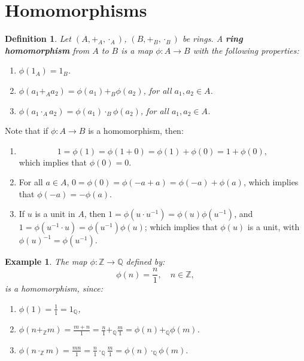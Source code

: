 \documentclass[a4paper,12pt]{report}
\newcounter{statement}
\numberwithin{statement}{chapter}
\newtheorem{defn}[statement]{Definition}
\newtheorem{eg}[statement]{\bf Example}
\numberwithin{equation}{chapter}
\numberwithin{section}{chapter}
\numberwithin{subsection}{section}
\begin{document}
\section{Homomorphisms}

\begin{defn}
Let $(A, +_A, \cdot_A)$, $(B, +_B, \cdot_B)$ be rings.  A  {\bf ring homomorphism}  from $A$ to $B$
is a map $\phi: A \rightarrow B$ with the following properties:
\begin{enumerate}
\item 
$\phi(1_A) = 1_B$.

\item 
$\phi(a_1 +_A a_2) = \phi(a_1) +_B \phi(a_2)$, for all $a_1, a_2 \in A$.

\item 
$\phi(a_1\cdot_A a_2) = \phi(a_1)\cdot_B \phi(a_2)$, for all $a_1, a_2 \in A$.
\end{enumerate}
\end{defn}



Note that if $\phi : A \rightarrow B$ is a homomorphism, then:
\begin{enumerate}
\item 
\[
1 = \phi(1) = \phi(1 + 0) = \phi(1) + \phi(0) = 1 + \phi(0),
\]
which implies that $\phi(0) = 0$.

\item 
For all $a \in A$, $0 = \phi(0) = \phi(-a + a) = \phi(-a) + \phi(a)$,
which implies that $\phi(-a) = -\phi(a)$.

\item 
If $u$ is a unit in $A$, then $1 = \phi(u\cdot u^{-1}) = \phi(u)\phi(u^{-1})$,
and $1 = \phi(u^{-1}\cdot u) = \phi(u^{-1})\phi(u)$;
which implies that $\phi(u)$ is a unit, with $\phi(u)^{-1} = \phi(u^{-1})$.

\end{enumerate}




\begin{eg}
The map $\phi : \mathbb{Z}\rightarrow \mathbb{Q}$ defined by:
\[
\phi(n) = \frac{n}{1}, \quad n \in \mathbb{Z},
\]
is a homomorphism, since:
\begin{enumerate}
\item 
$\phi(1) = \frac{1}{1} = 1_{\mathbb{Q}}$,

\item 
$\phi(n +_\mathbb{Z} m)  = \frac{m + n}{1}
= \frac{n}{1} +_{\mathbb{Q}} \frac{m}{1}
= \phi(n) +_{\mathbb{Q}} \phi(m)$.

\item 
$\phi(n \cdot_\mathbb{Z} m)
= \frac{mn}{1} = \frac{n}{1} \cdot_{\mathbb{Q}} \frac{m}{1}
= \phi(n)\cdot_{\mathbb{Q}} \phi(m).
$
\end{enumerate}
\end{eg}
\end{document}
